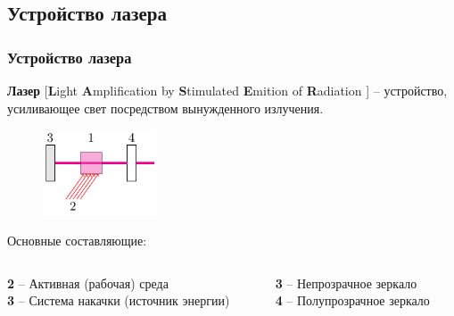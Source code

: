 \documentclass[10pt,pdf,hyperref={unicode}, dvipsnames]{beamer}
\newcommand\frametitless[1]{\subsection{#1}\frametitle{#1}}
\begin{document}
\begin{frame}[t]
	\frametitless{Устройство лазера}
	\textbf{Лазер} [\textbf{L}ight \textbf{A}mplification by \textbf{S}timulated \textbf{E}mition of \textbf{R}adiation ] -- устройство, усиливающее свет посредством вынужденного излучения.

	\begin{figure}[h]
		\centering
		\includegraphics[width=0.3\textwidth]{images/las1}
	\end{figure}	




	Основные составляющие:
		\vspace{1em}
	\begin{columns}[t]
		\begin{column}{0.45\textwidth}
				\textbf{2} -- Активная (рабочая) среда\\
				\textbf{3} -- Система накачки (источник энергии)
		\end{column}
		\begin{column}{0.45\textwidth}
				\textbf{3} -- Непрозрачное зеркало\\
				\textbf{4} -- Полупрозрачное зеркало
		\end{column}
	\end{columns}
\end{frame}
\end{document}
